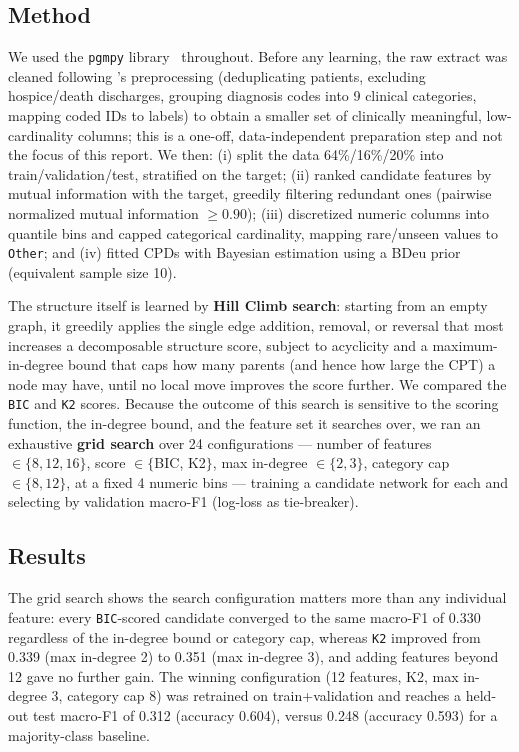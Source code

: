 \documentclass[letterpaper]{article}
\begin{document}
\subsection{Method}
We used the \texttt{pgmpy} library~\cite{pgmpy} throughout. Before any learning, the raw extract was cleaned following \cite{strack2014impact}'s preprocessing (deduplicating patients, excluding hospice/death discharges, grouping diagnosis codes into 9 clinical categories, mapping coded IDs to labels) to obtain a smaller set of clinically meaningful, low-cardinality columns; this is a one-off, data-independent preparation step and not the focus of this report. We then: (i) split the data 64\%/16\%/20\% into train/validation/test, stratified on the target; (ii) ranked candidate features by mutual information with the target, greedily filtering redundant ones (pairwise normalized mutual information $\geq 0.90$); (iii) discretized numeric columns into quantile bins and capped categorical cardinality, mapping rare/unseen values to \texttt{Other}; and (iv) fitted CPDs with Bayesian estimation using a BDeu prior (equivalent sample size 10).

The structure itself is learned by \textbf{Hill Climb search}: starting from an empty graph, it greedily applies the single edge addition, removal, or reversal that most increases a decomposable structure score, subject to acyclicity and a maximum-in-degree bound that caps how many parents (and hence how large the CPT) a node may have, until no local move improves the score further. We compared the \texttt{BIC} and \texttt{K2} scores. Because the outcome of this search is sensitive to the scoring function, the in-degree bound, and the feature set it searches over, we ran an exhaustive \textbf{grid search} over 24 configurations — number of features $\in\{8,12,16\}$, score $\in\{$BIC, K2$\}$, max in-degree $\in\{2,3\}$, category cap $\in\{8,12\}$, at a fixed 4 numeric bins — training a candidate network for each and selecting by validation macro-F1 (log-loss as tie-breaker).

\subsection{Results}
The grid search shows the search configuration matters more than any individual feature: every \texttt{BIC}-scored candidate converged to the same macro-F1 of 0.330 regardless of the in-degree bound or category cap, whereas \texttt{K2} improved from 0.339 (max in-degree 2) to 0.351 (max in-degree 3), and adding features beyond 12 gave no further gain. The winning configuration (12 features, K2, max in-degree 3, category cap 8) was retrained on train+validation and reaches a held-out test macro-F1 of 0.312 (accuracy 0.604), versus 0.248 (accuracy 0.593) for a majority-class baseline.
\end{document}
